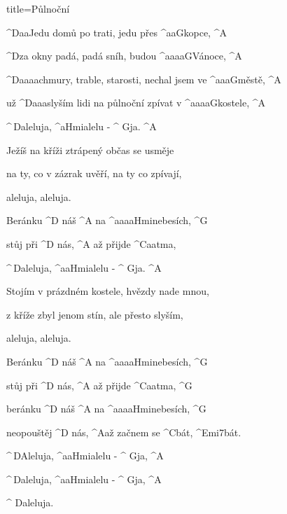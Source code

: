 \begin{song}{title=\predtitle\centering Půlnoční \\\large   \vspace*{-0.3cm}}  %
\begin{centerjustified}
\nejvetsi

\sloka
	^{D{\color{white}aa}}Jedu domů po trati, jedu přes ^{{\color{white}aa}G}kopce, ^{A}

	^{D}za okny padá, padá sníh, budou ^{{\color{white}aaaa}G}Vánoce, ^{A}

	^{D{\color{white}aaaa}}chmury, trable, starosti, nechal jsem ve ^{{\color{white}aaa}G}městě, ^{A}

	už ^{D{\color{white}aaa}}slyším lidi na půlnoční zpívat v ^{{\color{white}aaaa}G}kostele, ^{A}

	^{\,D}aleluja, ^{{\color{white}a}Hmi}alelu - ^{\,\,G}ja. ^{A}

\sloka
	Ježíš na kříži ztrápený občas se usměje

	na ty, co v zázrak uvěří, na ty co zpívají,

	aleluja, aleluja.

	Beránku ^{D\,\,}náš ^{A} na ^{{\color{white}aaaa}Hmi}nebesích, ^{G}

	stůj při ^{D\,\,}nás, ^{A} až přijde ^{C{\color{white}aa}}tma,

	^{\,D}aleluja, ^{{\color{white}aa}Hmi}alelu - ^{\,\,G}ja. ^{A}


\sloka
	Stojím v prázdném kostele, hvězdy nade mnou,

	z kříže zbyl jenom stín, ale přesto slyším,

	aleluja, aleluja.


	Beránku ^{D\,\,}náš ^{A} na ^{{\color{white}aaaa}Hmi}nebesích, ^{G}

	stůj při ^{D\,\,}nás, ^{A} až přijde ^{C{\color{white}aa}}tma, ^{G}

	beránku ^{D\,\,}náš ^{A} na ^{{\color{white}aaaa}Hmi}nebesích, ^{G}

	neopouštěj ^{D\,\,}nás, ^{A}až začnem se ^{C}bát, ^{Emi7}bát.

	^{\,D}Aleluja, ^{{\color{white}aa}Hmi}alelu - ^{\,\,G}ja, ^{A}

	^{\,D}aleluja, ^{{\color{white}aa}Hmi}alelu - ^{\,\,G}ja, ^{A}

	^{\,\,D}aleluja.

\end{centerjustified}
\setcounter{Slokočet}{0}
\end{song}

